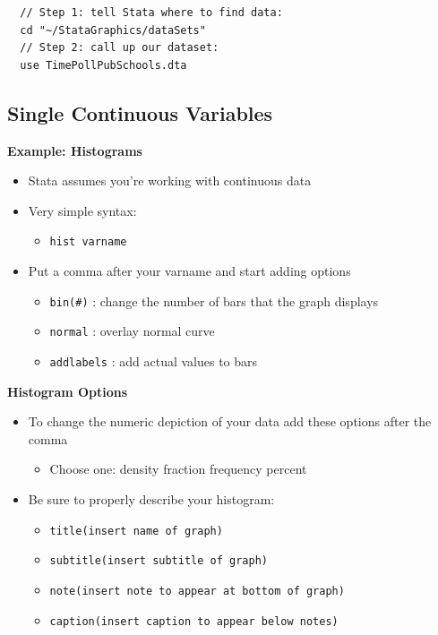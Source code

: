 \documentclass[]{book}
\providecommand{\tightlist}{%
  \setlength{\itemsep}{0pt}\setlength{\parskip}{0pt}}
\begin{document}
\begin{verbatim}
  // Step 1: tell Stata where to find data:
  cd "~/StataGraphics/dataSets"
  // Step 2: call up our dataset:
  use TimePollPubSchools.dta
\end{verbatim}

\subsection{Single Continuous
Variables}\label{single-continuous-variables}

\textbf{Example: Histograms}

\begin{itemize}
\tightlist
\item
  Stata assumes you're working with continuous data
\item
  Very simple syntax:

  \begin{itemize}
  \tightlist
  \item
    \texttt{hist\ varname}
  \end{itemize}
\item
  Put a comma after your varname and start adding options

  \begin{itemize}
  \tightlist
  \item
    \texttt{bin(\#)} : change the number of bars that the graph displays
  \item
    \texttt{normal} : overlay normal curve
  \item
    \texttt{addlabels} : add actual values to bars
  \end{itemize}
\end{itemize}

\textbf{Histogram Options}

\begin{itemize}
\tightlist
\item
  To change the numeric depiction of your data add these options after
  the comma

  \begin{itemize}
  \tightlist
  \item
    Choose one: density fraction frequency percent
  \end{itemize}
\item
  Be sure to properly describe your histogram:

  \begin{itemize}
  \tightlist
  \item
    \texttt{title(insert\ name\ of\ graph)}
  \item
    \texttt{subtitle(insert\ subtitle\ of\ graph)}
  \item
    \texttt{note(insert\ note\ to\ appear\ at\ bottom\ of\ graph)}
  \item
    \texttt{caption(insert\ caption\ to\ appear\ below\ notes)}
  \end{itemize}
\end{itemize}
\end{document}
